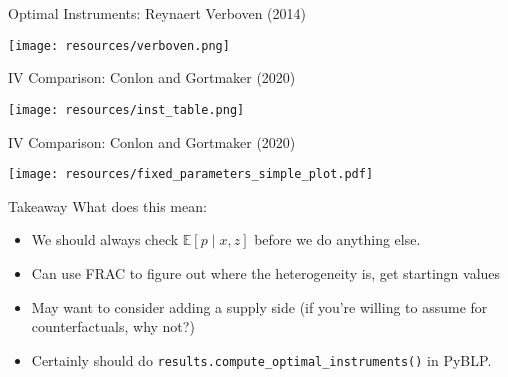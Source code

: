 \begin{frame}{Optimal Instruments: Reynaert Verboven (2014)}
\begin{center}
\texttt{[image: resources/verboven.png]}
\end{center}
\end{frame}




\begin{frame}{IV Comparison: Conlon and Gortmaker (2020)}
\begin{center}
\texttt{[image: resources/inst\_table.png]}
\end{center}
\end{frame}

\begin{frame}{IV Comparison: Conlon and Gortmaker (2020)}
\begin{center}
\texttt{[image: resources/fixed\_parameters\_simple\_plot.pdf]}
\end{center}
\end{frame}



\begin{frame}{Takeaway}
What does this mean:
\begin{itemize}
    \item We should always check $\mathbb{E}[p \mid x, z]$ before we do anything else.
    \item Can use FRAC to figure out where the heterogeneity is, get startingn values
    \item May want to consider adding a supply side (if you're willing to assume for counterfactuals, why not?)
    \item Certainly should do \texttt{results.compute\_optimal\_instruments()} in PyBLP.
\end{itemize}
\end{frame}


